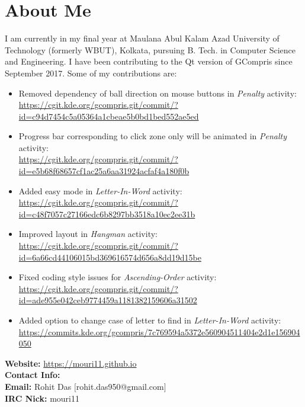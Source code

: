\documentclass[preprint,12pt]{elsarticle}
\begin{document}
\section{About Me}
\label{S:1}
{I am currently in my final year at Maulana Abul Kalam Azad University of Technology (formerly WBUT), Kolkata, pursuing B. Tech. in Computer Science and Engineering. I have been contributing to the Qt version of GCompris since September 2017. Some of my contributions are:}
\begin{itemize}
\item {Removed dependency of ball direction on mouse buttons in \textit{Penalty} activity:\\
\href{https://cgit.kde.org/gcompris.git/commit/?id=c94d7454c5a05364a1cbeae5b0bd1bed552ae5ed}{https://cgit.kde.org/gcompris.git/commit/?id=c94d7454c5a05364a1cbeae5b0bd1bed552ae5ed}}

\item {Progress bar corresponding to click zone only will be animated in \textit{Penalty} activity:\\
 \href{https://cgit.kde.org/gcompris.git/commit/?id=e5b68f68657cf1ac25a6aa31924acfaf4a180f0b}{https://cgit.kde.org/gcompris.git/commit/?id=e5b68f68657cf1ac25a6aa31924acfaf4a180f0b}}

\item {Added easy mode in \textit{Letter-In-Word} activity:\\
\href{https://cgit.kde.org/gcompris.git/commit/?id=c48f7057c27166edc6b8297bb3518a10ec2ee31b}{https://cgit.kde.org/gcompris.git/commit/?id=c48f7057c27166edc6b8297bb3518a10ec2ee31b}}

\item {Improved layout in \textit{Hangman} activity:\\
\href{https://cgit.kde.org/gcompris.git/commit/?id=6a66cd44106015bd369616574d656a8dd19d15be}{https://cgit.kde.org/gcompris.git/commit/?id=6a66cd44106015bd369616574d656a8dd19d15be}}

\item {Fixed coding style issues for \textit{Ascending-Order} activity:\\
\href{https://cgit.kde.org/gcompris.git/commit/?id=ade955e042ceb9774459a1181382159606a31502}{https://cgit.kde.org/gcompris.git/commit/?id=ade955e042ceb9774459a1181382159606a31502}}

\item {Added option to change case of letter to find in \textit{Letter-In-Word} activity:\\
\href{https://commits.kde.org/gcompris/7c769594a5372e560904511404e2d1e156904050}{https://commits.kde.org/gcompris/7c769594a5372e560904511404e2d1e156904050}}
\end{itemize}
\bigskip
\textbf{Website: }\href{https://mouri11.github.io}{https://mouri11.github.io}\\
\textbf{Contact Info:}\\
\textbf{Email: }{Rohit Das $[$rohit.das950@gmail.com$]$}\\
\textbf{IRC Nick: } mouri11
\end{document}

